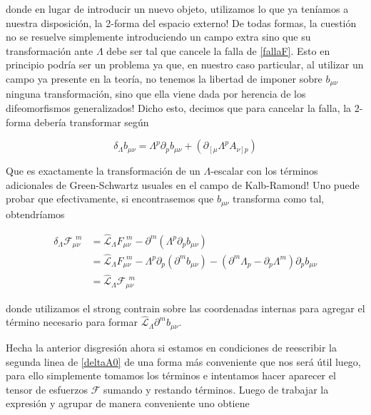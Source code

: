 \documentclass{article}
\numberwithin{equation}{section}
\begin{document}
donde en lugar de introducir un nuevo objeto, utilizamos lo que ya teníamos a nuestra disposición, la 2-forma del espacio externo! De todas formas, la cuestión no se resuelve simplemente introduciendo un campo extra sino que su transformación ante $ \Lambda $ debe ser tal que cancele la falla de \ref{fallaF}. Esto en principio podría ser un problema ya que, en nuestro caso particular, al utilizar un campo ya presente en la teoría, no tenemos la libertad de imponer sobre $ b_{\mu \nu} $ ninguna transformación, sino que ella viene dada por herencia de los difeomorfismos generalizados! Dicho esto, decimos que para cancelar la falla, la 2-forma debería transformar según

\begin{equation}\label{deltab}
\delta_{\Lambda} b_{\mu \nu} = \Lambda^p \partial_p b_{\mu \nu} + \left( \partial_{\left[\mu\right.} \Lambda^p A_{\left. \nu\right] p} \right)
\end{equation} 

Que es exactamente la transformación de un $\Lambda$-escalar con los términos adicionales de Green-Schwartz usuales en el campo de Kalb-Ramond! Uno puede probar que efectivamente, si encontrasemos que $ b_{\mu \nu} $ transforma como tal, obtendríamos

\begin{equation}\label{deltaF}
\begin{aligned}
\delta_{\Lambda} \mathcal{F}_{\mu \nu}^{\ \ m} &= \hat{\mathcal{L}}_{\Lambda}F_{\mu \nu}^{\ \ m} - \partial^m \left( \Lambda^p \partial_p b_{\mu \nu} \right)\\
&= \hat{\mathcal{L}}_{\Lambda}F_{\mu \nu}^{\ \ m} - \Lambda^p \partial_p \left( \partial^m b_{\mu \nu} \right) - \left( \partial^m \Lambda_p - \partial_p \Lambda^m\right) \partial_p b_{\mu \nu}\\
&= \hat{\mathcal{L}}_{\Lambda} \mathcal{F}_{\mu \nu}^{\ \ m}
\end{aligned}
\end{equation}

donde utilizamos el strong contrain sobre las coordenadas internas para agregar el término necesario para formar $ \hat{\mathcal{L}}_{\Lambda} \partial^m b_{\mu \nu}$.

Hecha la anterior disgresión ahora si estamos en condiciones de reescribir la segunda linea de \ref{deltaA0} de una forma más conveniente que nos será útil luego, para ello simplemente tomamos los términos e intentamos hacer aparecer el tensor de esfuerzos $ \mathcal{F} $ sumando y restando términos. Luego de trabajar la expresión y agrupar de manera conveniente uno obtiene
\end{document}
